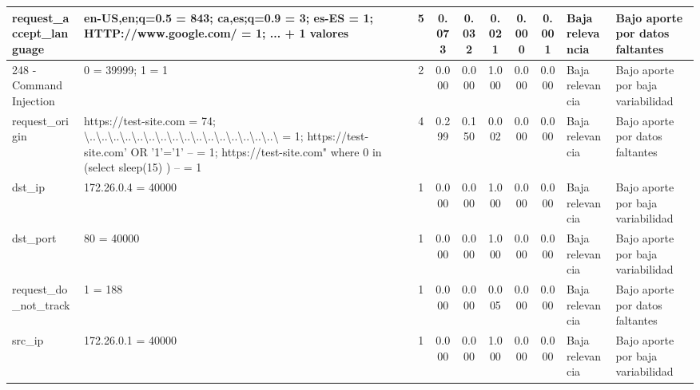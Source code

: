 \begin{table}[h]
\begin{tabular}{|p{2.1cm}|p{3.0cm}|c|c|c|c|c|c|p{2.5cm}|p{2.8cm}|}
\hline
request\_accept\_language & en-US,en;q=0.5 = 843; ca,es;q=0.9 = 3; es-ES = 1; HTTP://www.google.com/ = 1; ... + 1 valores & 5 & 0.073 & 0.032 & 0.021 & 0.000 & 0.001 & Baja relevancia & Bajo aporte por datos faltantes \\
\hline
248 - Command Injection & 0 = 39999; 1 = 1 & 2 & 0.000 & 0.000 & 1.000 & 0.000 & 0.000 & Baja relevancia & Bajo aporte por baja variabilidad \\
\hline
request\_origin & https://test-site.com = 74; \textbackslash{}..\textbackslash{}..\textbackslash{}..\textbackslash{}..\textbackslash{}..\textbackslash{}..\textbackslash{}..\textbackslash{}..\textbackslash{}..\textbackslash{}..\textbackslash{}..\textbackslash{}..\textbackslash{}..\textbackslash{}..\textbackslash{}..\textbackslash{}..\textbackslash{} = 1; https://test-site.com' OR '1'='1' -- = 1; https://test-site.com" where 0 in (select sleep(15) ) -- = 1 & 4 & 0.299 & 0.150 & 0.002 & 0.000 & 0.000 & Baja relevancia & Bajo aporte por datos faltantes \\
\hline
dst\_ip & 172.26.0.4 = 40000 & 1 & 0.000 & 0.000 & 1.000 & 0.000 & 0.000 & Baja relevancia & Bajo aporte por baja variabilidad \\
\hline
dst\_port & 80 = 40000 & 1 & 0.000 & 0.000 & 1.000 & 0.000 & 0.000 & Baja relevancia & Bajo aporte por baja variabilidad \\
\hline
request\_do\_not\_track & 1 = 188 & 1 & 0.000 & 0.000 & 0.005 & 0.000 & 0.000 & Baja relevancia & Bajo aporte por datos faltantes \\
\hline
src\_ip & 172.26.0.1 = 40000 & 1 & 0.000 & 0.000 & 1.000 & 0.000 & 0.000 & Baja relevancia & Bajo aporte por baja variabilidad \\
\hline
\end{tabular}
\end{table}
